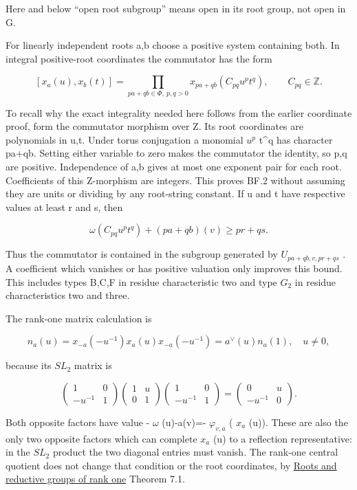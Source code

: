 \documentclass[
  11pt,
]{article}
\begin{document}
Here and below ``open root subgroup'' means open in its root group, not
open in G.

For linearly independent roots a,b choose a positive system containing
both. In integral positive-root coordinates the commutator has the form

\[
 [x_a(u),x_b(t)]
 =\prod_{pa+qb\in\Phi,\ p,q>0}
 x_{pa+qb}(C_{pq}u^pt^q),\qquad C_{pq}\in\mathbb Z.
 \tag{BF.2}
\]

To recall why the exact integrality needed here follows from the earlier
coordinate proof, form the commutator morphism over Z. Its root
coordinates are polynomials in u,t. Under torus conjugation a monomial
\(u^p\) t\^{}q has character pa+qb. Setting either variable to zero
makes the commutator the identity, so p,q are positive. Independence of
a,b gives at most one exponent pair for each root. Coefficients of this
Z-morphism are integers. This proves BF.2 without assuming they are
units or dividing by any root-string constant. If u and t have
respective values at least r and s, then

\[
 \omega(C_{pq}u^pt^q)+(pa+qb)(v)\ge pr+qs.
\]

Thus the commutator is contained in the subgroup generated by
\(U_{pa+qb,v,pr+qs}\) . A coefficient which vanishes or has positive
valuation only improves this bound. This includes types B,C,F in residue
characteristic two and type \(G_{2}\) in residue characteristics two and
three.

The rank-one matrix calculation is

\[
 n_a(u)=x_{-a}(-u^{-1})x_a(u)x_{-a}(-u^{-1})
 =a^\vee(u)n_a(1),\quad u\ne0,
\]

because its \(SL_{2}\) matrix is

\[
 \begin{pmatrix}1&0\\-u^{-1}&1\end{pmatrix}
 \begin{pmatrix}1&u\\0&1\end{pmatrix}
 \begin{pmatrix}1&0\\-u^{-1}&1\end{pmatrix}
 =\begin{pmatrix}0&u\\-u^{-1}&0\end{pmatrix}.
 \tag{BF.3}
\]

Both opposite factors have value - \(\omega\) (u)-a(v)=-
\(\varphi_{v,a}\) ( \(x_{a}\) (u)). These are also the only two opposite
factors which can complete \(x_{a}\) (u) to a reflection representative:
in the \(SL_{2}\) product the two diagonal entries must vanish. The
rank-one central quotient does not change that condition or the root
coordinates, by \href{../AG-RG/AG-RG-03.html}{Roots and reductive groups
of rank one} Theorem 7.1.
\end{document}
